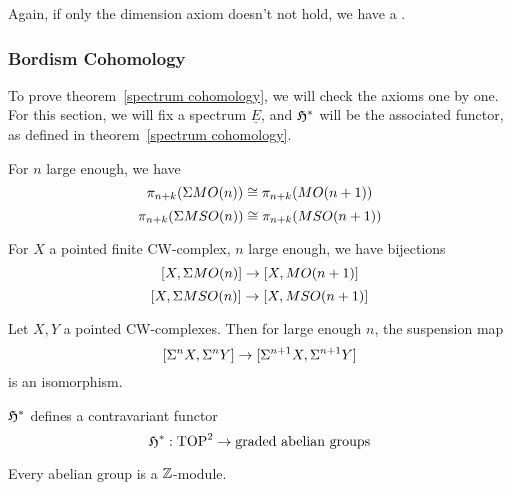 \documentclass[a4paper,12pt]{article}
\begin{document}
Again, if only the dimension axiom doesn't not hold, we have a .

\subsubsection{Bordism Cohomology}\label{cohomology}
To prove theorem\ \ref{spectrum cohomology}, we will check the axioms one by one. For this section, we will fix a spectrum \(\underline{E}\), and \(\mathfrak{H}^\ast\) will be the associated functor, as defined in theorem\ \ref{spectrum cohomology}.

\begin{theorem}
    For \(n\) large enough, we have
    \[\pi_{n+k}(\Sigma MO(n))\cong\pi_{n+k}(MO(n+1))\]
    \[\pi_{n+k}(\Sigma MSO(n))\cong\pi_{n+k}(MSO(n+1))\]
\end{theorem}

\begin{corollary}
    For \(X\) a pointed finite CW-complex, \(n\) large enough, we have bijections
    \[[X,\Sigma MO(n)]\to[X,MO(n+1)]\]
    \[[X,\Sigma MSO(n)]\to[X,MSO(n+1)]\]
\end{corollary}

\begin{theorem}\label{freudenthal}
    Let \(X,Y\) a pointed CW-complexes. Then for large enough \(n\), the suspension map
    \[[\Sigma^n X,\Sigma^n Y]\to[\Sigma^{n+1} X,\Sigma^{n+1}Y]\]
    is an isomorphism.
\end{theorem}

\begin{lemma}[Functoriality]\label{cofunctoriality}
    \(\mathfrak{H}^\ast\) defines a contravariant functor
    \[\mathfrak{H}^\ast:\mathrm{TOP}^2\to \text{graded abelian groups}\]
\end{lemma}

\begin{remark}
    Every abelian group is a \(\mathbb{Z}\)-module.
\end{remark}
\end{document}
